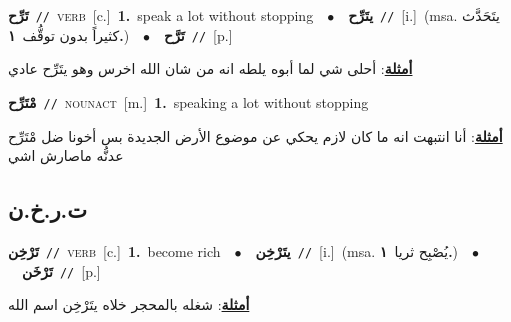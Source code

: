 \documentclass[10pt,a4paper,twoside]{article} %
\begin{document}
\begin{multicols}{2}
{{{{{\setlength\topsep{0pt}\textbf{\foreignlanguage{arabic}{تَرِّح}}\ {\color{gray}\texttt{//}\color{black}}\ \textsc{verb}\ [c.]\ \textbf{1.}~speak a lot without stopping\ \ $\bullet$\ \ \setlength\topsep{0pt}\textbf{\foreignlanguage{arabic}{يتَرِّح}}\ {\color{gray}\texttt{//}\color{black}}\ [i.]\ \color{gray}(msa. \foreignlanguage{arabic}{يتَحَدَّث كثيراً بدون توقُّف}~\foreignlanguage{arabic}{\textbf{١.}})\color{black}\ \ $\bullet$\ \ \setlength\topsep{0pt}\textbf{\foreignlanguage{arabic}{تَرَّح}}\ {\color{gray}\texttt{//}\color{black}}\ [p.]\  \begin{flushright}\color{gray}\foreignlanguage{arabic}{\textbf{\underline{\foreignlanguage{arabic}{أمثلة}}}: أحلى شي لما أبوه يلطه انه من شان الله اخرس وهو يتَرِّح عادي}\end{flushright}\color{black}} \vspace{2mm}

{\setlength\topsep{0pt}\textbf{\foreignlanguage{arabic}{مْتَرِّح}}\ {\color{gray}\texttt{//}\color{black}}\ \textsc{noun\textunderscore act}\ [m.]\ \textbf{1.}~speaking a lot without stopping\  \begin{flushright}\color{gray}\foreignlanguage{arabic}{\textbf{\underline{\foreignlanguage{arabic}{أمثلة}}}: أنا انتبهت انه ما كان لازم يحكي عن موضوع الأرض الجديدة بس أخونا ضل مْتَرِّح عدنُّه ماصارش اشي}\end{flushright}\color{black}} \vspace{2mm}

\vspace{-3mm}
\subsection*{\color{blue}\foreignlanguage{arabic}{ت.ر.خ.ن}\color{blue}{}} 

{\setlength\topsep{0pt}\textbf{\foreignlanguage{arabic}{تَرْخِن}}\ {\color{gray}\texttt{//}\color{black}}\ \textsc{verb}\ [c.]\ \textbf{1.}~become rich\ \ $\bullet$\ \ \setlength\topsep{0pt}\textbf{\foreignlanguage{arabic}{يتَرْخِن}}\ {\color{gray}\texttt{//}\color{black}}\ [i.]\ \color{gray}(msa. \foreignlanguage{arabic}{يُصْبِح ثريا}~\foreignlanguage{arabic}{\textbf{١.}})\color{black}\ \ $\bullet$\ \ \setlength\topsep{0pt}\textbf{\foreignlanguage{arabic}{تَرْخَن}}\ {\color{gray}\texttt{//}\color{black}}\ [p.]\  \begin{flushright}\color{gray}\foreignlanguage{arabic}{\textbf{\underline{\foreignlanguage{arabic}{أمثلة}}}: شغله بالمحجر خلاه يتَرْخِن اسم الله}\end{flushright}\color{black}} \vspace{2mm}

}}}}
\end{multicols}
\end{document}
